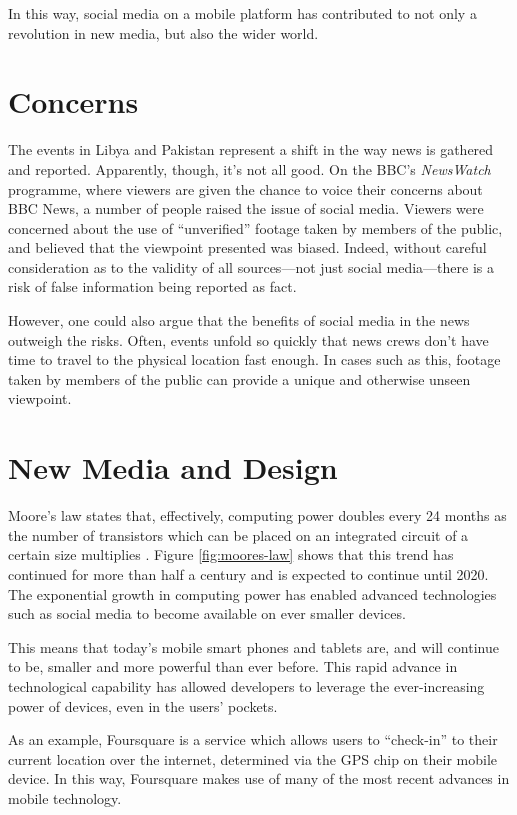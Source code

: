 \documentclass[a4paper,11pt]{article}
\begin{document}
    In this way, social media on a mobile platform has contributed to not only
    a revolution in new media, but also the wider world.

    \section{Concerns}

    The events in Libya and Pakistan represent a shift in the way news is
    gathered and reported.  Apparently, though, it's not all good. On the BBC's
    \emph{NewsWatch} programme, where viewers are given the chance to voice
    their concerns about BBC News, a number of people raised the issue of
    social media. Viewers were concerned about the use of ``unverified''
    footage taken by members of the public, and believed that the viewpoint
    presented was biased. Indeed, without careful consideration as to the
    validity of all sources---not just social media---there is a risk of false
    information being reported as fact.

    However, one could also argue that the benefits of social media in the news
    outweigh the risks. Often, events unfold so quickly that news crews don't
    have time to travel to the physical location fast enough. In cases such as
    this, footage taken by members of the public can provide a unique and
    otherwise unseen viewpoint.

    \section{New Media and Design}

    Moore's law states that, effectively, computing power doubles every 24
    months as the number of transistors which can be placed on an integrated
    circuit of a certain size multiplies \cite{schaller1997}. Figure
    \ref{fig:moores-law} shows that this trend has continued for more than half
    a century and is expected to continue until 2020. The exponential growth in
    computing power has enabled advanced technologies such as social media to
    become available on ever smaller devices.

    This means that today's mobile smart phones and tablets are, and will
    continue to be, smaller and more powerful than ever before. This rapid
    advance in technological capability has allowed developers to leverage the
    ever-increasing power of devices, even in the users' pockets.

    As an example, Foursquare is a service which allows users to ``check-in''
    to their current location over the internet, determined via the GPS chip on
    their mobile device. In this way, Foursquare makes use of many of the most
    recent advances in mobile technology.
    
\end{document}
